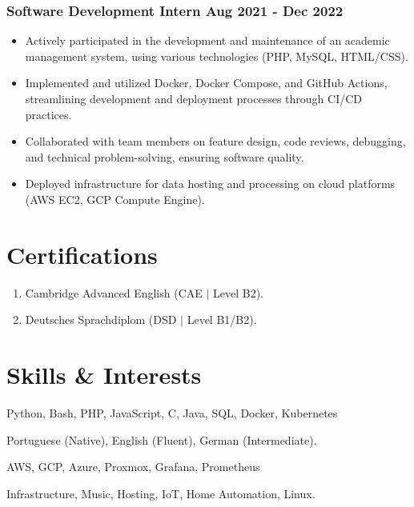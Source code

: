 \documentclass[11pt]{article} %
\begin{document}
\subsubsection{Software Development Intern \hfill  Aug 2021 - Dec 2022}
\begin{itemize}
    \item Actively participated in the development and maintenance of an academic management system, using various technologies (PHP, MySQL, HTML/CSS).
	\item Implemented and utilized Docker, Docker Compose, and GitHub Actions, streamlining development and deployment processes through CI/CD practices.
	\item Collaborated with team members on feature design, code reviews, debugging, and technical problem-solving, ensuring software quality.
	\item Deployed infrastructure for data hosting and processing on cloud platforms (AWS EC2, GCP Compute Engine).
\end{itemize}


\section{Certifications}
\begin{enumerate}[label=\null, left=0pt..0pt, itemsep=0pt]
    \item Cambridge Advanced English (CAE $|$ Level B2).
	\item Deutsches Sprachdiplom (DSD $|$ Level B1/B2).
\end{enumerate}

\section{Skills \& Interests}
\begin{description}[itemsep=0pt]
	\item[Technologies] Python, Bash, PHP, JavaScript, C, Java, SQL, Docker, Kubernetes
	\item[Languages] Portuguese (Native), English (Fluent), German (Intermediate).
	\item[Platforms/Hosting] AWS, GCP, Azure, Proxmox, Grafana, Prometheus %
	\item[Interests] Infrastructure, Music, Hosting, IoT, Home Automation, Linux.
\end{description}
\end{document}
